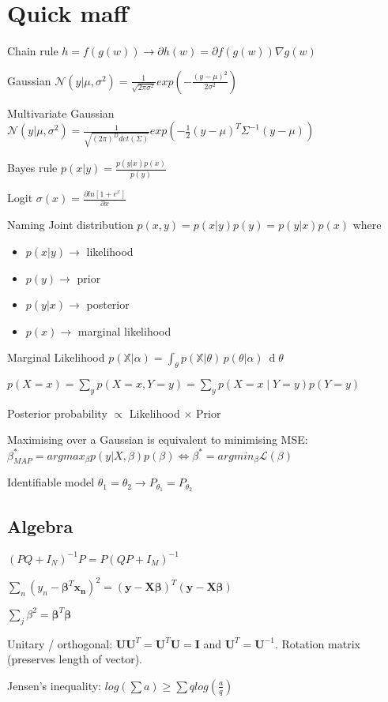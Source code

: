 \section{Quick maff}
Chain rule $h = f(g(w)) \rightarrow \partial h(w) = \partial f(g(w)) \nabla g(w)$

Gaussian $\mathcal{N}(y|\mu, \sigma^2) = \frac{1}{\sqrt{2\pi \sigma^2}} exp(-\frac{(y-\mu)^2}{2\sigma^2})$

Multivariate Gaussian $\mathcal{N}(y|\mu, \sigma^2) = \frac{1}{\sqrt{(2\pi)^D det(\Sigma)}} exp(-\frac{1}{2} (y-\mu)^T \Sigma^{-1} (y-\mu))$

Bayes rule $p(x|y) = \frac{p(y|x) p(x)}{p(y)}$

Logit $\sigma(x) = \frac{\partial ln[1+e^x]}{\partial x}$

Naming
Joint distribution $p(x,y) = p(x|y)p(y)=p(y|x)p(x)$ where
\begin{itemize}
\item $p(x|y) \rightarrow$ likelihood 
\item $p(y) \rightarrow$ prior
\item $p(y|x) \rightarrow$ posterior
\item $p(x) \rightarrow$ marginal likelihood
\end{itemize}

Marginal Likelihood \newline $p({\mathbb  {X}}|\alpha )=\int _{\theta }p({\mathbb  {X}}|\theta )\,p(\theta |\alpha )\ \operatorname {d}\!\theta $

$p(X=x)=\sum_{y} p(X=x,Y=y) = \sum_{y} p(X=x \mid Y=y) p(Y=y)$

Posterior probability $\propto$ Likelihood $\times$ Prior

Maximising over a Gaussian is equivalent to minimising MSE: $\beta_{MAP}^* = arg max_{\beta} p(y|X,\beta)p(\beta) \Leftrightarrow \beta^* = arg min_{\beta} \mathcal{L}(\beta)$

Identifiable model \newline
$\theta_1 = \theta_2 \rightarrow P_{\theta_1} = P_{\theta_2}$

\subsection{Algebra}
$(PQ + I_N)^{-1} P = P (QP + I_M)^{-1}$

$\sum_n (y_{n} -\mathbf{\beta}^T\mathbf{x_n})^2 = (\mathbf{y} - \mathbf{X}\mathbf{\beta})^T(\mathbf{y} - \mathbf{X}\mathbf{\beta})$

$\sum_j \beta^2 = \mathbf{\beta}^T \mathbf{\beta}$

Unitary / orthogonal: $\mathbf{U}\mathbf{U}^T=\mathbf{U}^T\mathbf{U} = \mathbf{I}$ and $\mathbf{U}^T = \mathbf{U}^{-1}$. Rotation matrix (preserves length of vector).

Jensen's inequality: \newline $log(\sum a) \ge \sum q log(\frac{a}{q})$